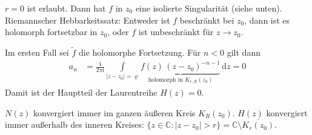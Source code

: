 \documentclass[a4paper,10pt]{scrbook}
\begin{document}
\begin{notice}
  \begin{enum-arab}
    \item $r=0$ ist erlaubt. Dann hat $f$ in $z_0$ eine isolierte Singularität (siehe unten). Riemannscher Hebbarkeitssatz: Entweder ist $f$ beschränkt bei $z_0$, dann ist es holomorph fortsetzbar in $z_0$, oder $f$ ist unbeschränkt für $z \to z_0$.

    Im ersten Fall sei $\widetilde{f}$ die holomorphe Fortsetzung. Für $n<0$ gilt dann
    \begin{align*}
      a_n &= \frac{1}{2 \pi \mathrm{i}} \int\limits_{|z-z_0|=\varrho} \underbrace{f(z) \, (z-z_0)^{-n-1}}_{\text{holomorph in }K_{r,R}(z_0)} \, \mathrm{d}z = 0
    \end{align*}
    Damit ist der Hauptteil der Laurentreihe $H(z) = 0$.

    \item $N(z)$ konvergiert immer im ganzen äußeren Kreis $K_{R}(z_0)$. $H(z)$ konvergiert immer außerhalb des inneren Kreises: $\{z \in \mathbb{C} : |z-z_0| > r \} = \mathbb{C} \setminus \overline{K_r(z_0)}$.
  \end{enum-arab}
\end{notice}
\end{document}
